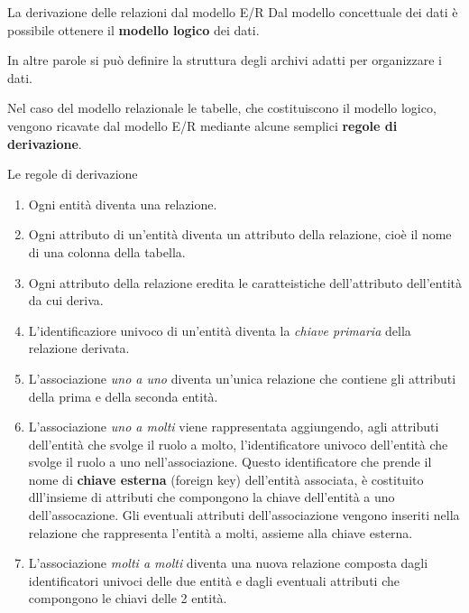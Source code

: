 \begin{frame}{La derivazione delle relazioni dal modello E/R}
Dal modello concettuale dei dati \`e possibile ottenere il \textbf{modello logico} dei dati.

\pause
In altre parole si pu\`o definire la struttura degli archivi adatti per organizzare i dati.

\pause
Nel caso del modello relazionale le tabelle, che costituiscono il modello logico, vengono ricavate dal modello E/R mediante alcune semplici \textbf{regole di derivazione}.
\end{frame}
%
\begin{frame}[allowframebreaks]{Le regole di derivazione}
\begin{enumerate}
    \item Ogni entit\`a diventa una relazione.
    \item Ogni attributo di un'entit\`a diventa un attributo della relazione, cio\`e il nome di una colonna della tabella.
    \item Ogni attributo della relazione eredita le caratteistiche dell'attributo dell'entit\`a da cui deriva.
    \item L'identificaziore univoco di un'entit\`a diventa la \textit{chiave primaria} della relazione derivata.
    \item L'associazione \textit{uno a uno} diventa un'unica relazione che contiene gli attributi della prima e della seconda entit\`a.
    \item L'associazione \textit{uno a molti} viene rappresentata aggiungendo, agli attributi dell'entit\`a che svolge il ruolo a molto, l'identificatore univoco dell'entit\`a che svolge il ruolo a uno nell'associazione. Questo identificatore che prende il nome di \textbf{chiave esterna} (foreign key) dell'entit\`a associata, \`e costituito dll'insieme di attributi che compongono la chiave dell'entit\`a a uno dell'assocazione. Gli eventuali attributi dell'associazione vengono inseriti nella relazione che rappresenta l'entit\`a a molti, assieme alla chiave esterna.
    \item L'associazione \textit{molti a molti} diventa una nuova relazione composta dagli identificatori univoci delle due entit\`a e dagli eventuali attributi che compongono le chiavi delle 2 entit\`a.
\end{enumerate}
\end{frame}
%
